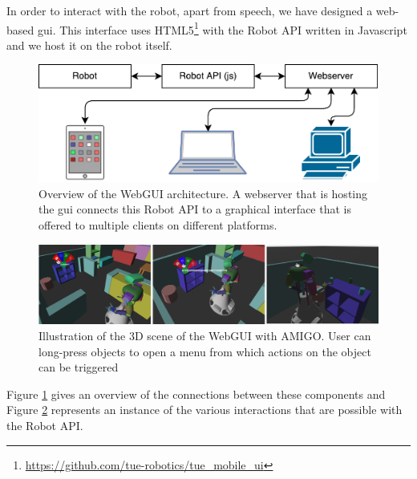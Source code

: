 \label{ssec:webgui}
In order to interact with the robot, apart from speech, we have designed a web-based \gls{gui}. This interface uses HTML5\footnote{\url{https://github.com/tue-robotics/tue_mobile_ui}} with the Robot API written in Javascript and we host it on the robot itself.
\begin{figure}[h]
    \centering
	\includegraphics[width=0.9\linewidth]{Figures/webgui_architecture}
	\caption{
		Overview of the WebGUI architecture.
		A webserver that is hosting the \protect\gls{gui} connects this Robot API to a graphical interface that is offered to multiple clients on different platforms.}
	\label{fig:webgui_architecture}
\end{figure}

\begin{figure}[H]
	\includegraphics[width=\linewidth]{Figures/gui_actions}
	\caption{
		Illustration of the 3D scene of the WebGUI with AMIGO.
		User can long-press objects to open a menu from which actions on the object can be triggered
		}
	\label{fig:gui_actions}

\end{figure}
Figure \ref{fig:webgui_architecture} gives an overview of the connections between these components and Figure \ref{fig:gui_actions} represents an instance of the various interactions that are possible with the Robot API.
